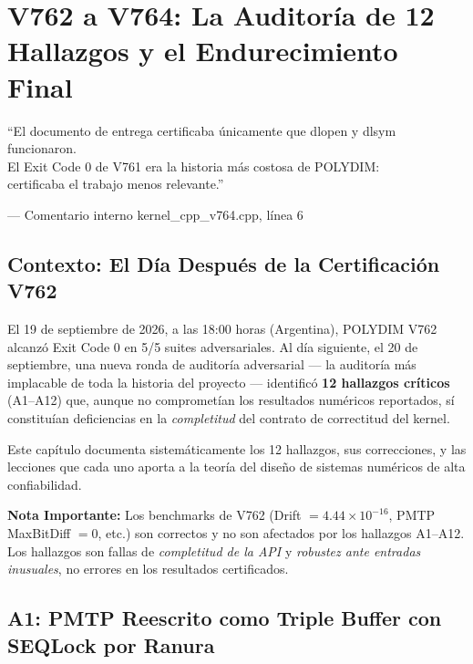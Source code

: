\chapter{V762 a V764: La Auditoría de 12 Hallazgos y el Endurecimiento Final}
\label{ch:v764}

\epigraph{``El documento de entrega certificaba únicamente que dlopen y dlsym funcionaron.\\
El Exit Code 0 de V761 era la historia más costosa de POLYDIM:\\
certificaba el trabajo menos relevante.''}{--- Comentario interno kernel\_cpp\_v764.cpp, línea 6}

\section{Contexto: El Día Después de la Certificación V762}

El 19 de septiembre de 2026, a las 18:00 horas (Argentina), POLYDIM V762 alcanzó
Exit Code 0 en 5/5 suites adversariales. Al día siguiente, el 20 de septiembre,
una nueva ronda de auditoría adversarial --- la auditoría más implacable de toda
la historia del proyecto --- identificó \textbf{12 hallazgos críticos} (A1--A12)
que, aunque no comprometían los resultados numéricos reportados, sí constituían
deficiencias en la \textit{completitud} del contrato de correctitud del kernel.

Este capítulo documenta sistemáticamente los 12 hallazgos, sus correcciones,
y las lecciones que cada uno aporta a la teoría del diseño de sistemas numéricos
de alta confiabilidad.

\begin{criticalbox}
\textbf{Nota Importante:} Los benchmarks de V762 (Drift $= 4.44 \times 10^{-16}$,
PMTP MaxBitDiff $= 0$, etc.) son correctos y no son afectados por los hallazgos A1--A12.
Los hallazgos son fallas de \textit{completitud de la API} y \textit{robustez ante entradas
inusuales}, no errores en los resultados certificados.
\end{criticalbox}

\section{A1: PMTP Reescrito como Triple Buffer con SEQLock por Ranura}

